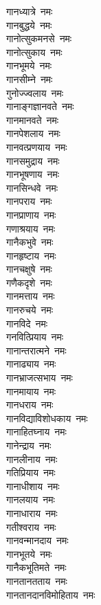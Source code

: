 \begin{multicols}{2}
\begin{flushleft}
गानध्यात्रे~नमः\\
गानबुद्धये~नमः\\
 गानोत्सुकमनसे~नमः\\
गानोत्सुकाय~नमः\\
गानभूमये~नमः\\
गानसीम्ने~नमः\\
गुनोज्ज्वलाय~नमः\hfill{}\\
गानाङ्गज्ञानवते~नमः\\
गानमानवते~नमः\\
गानपेशलाय~नमः\\
गानवत्प्रणयाय~नमः\\
गानसमुद्राय~नमः\\
गानभूषणाय~नमः\\
गानसिन्धवे~नमः\\
गानपराय~नमः\\
गानप्राणाय~नमः\\
गणाश्रयाय~नमः\hfill{}\\
गानैकभुवे~नमः\\
गानहृष्टाय~नमः\\
गानचक्षुषे~नमः\\
गणैकदृशे~नमः\\
गानमत्ताय~नमः\\
गानरुचये~नमः\\
गानविदे~नमः\\
गनवित्प्रियाय~नमः\\
गानान्तरात्मने~नमः\\
गानाढ्याय~नमः\hfill{}\\
गानभ्राजत्सभाय~नमः\\
गानमायाय~नमः\\
गानधराय~नमः\\
गानविद्याविशोधकाय~नमः\\
गानाहितघ्नाय~नमः\\
गानेन्द्राय~नमः\\
गानलीनाय~नमः\\
गतिप्रियाय~नमः\\
गानाधीशाय~नमः\\
गानलयाय~नमः\hfill{}\\
गानाधाराय~नमः\\
गतीश्वराय~नमः\\
गानवन्मानदाय~नमः\\
गानभूतये~नमः\\
गानैकभूतिमते~नमः\\
गानतानतताय~नमः\\
गानतानदानविमोहिताय~नमः\\

\end{flushleft}
\end{multicols}
